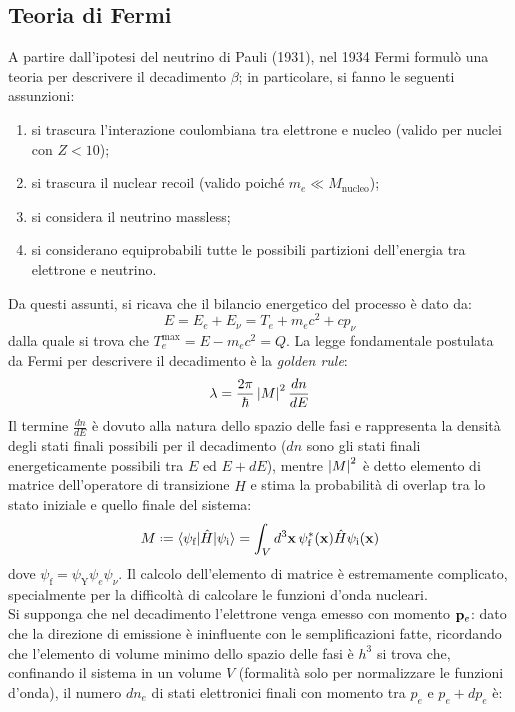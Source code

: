 \subsection{Teoria di Fermi}\label{fermi-th-sec}

A partire dall'ipotesi del neutrino di Pauli (1931), nel 1934 Fermi formulò una teoria per descrivere il decadimento $ \beta $; in particolare, si fanno le seguenti assunzioni:
\begin{enumerate}
	\item si trascura l'interazione coulombiana tra elettrone e nucleo (valido per nuclei con $ Z < 10 $);
	\item si trascura il nuclear recoil (valido poiché $ m_e \ll M_{\text{nucleo}} $);
	\item si considera il neutrino massless;
	\item si considerano equiprobabili tutte le possibili partizioni dell'energia tra elettrone e neutrino.
\end{enumerate}
Da questi assunti, si ricava che il bilancio energetico del processo è dato da:
\begin{equation}
	E = E_e + E_{\nu} = T_e + m_e c^2 + c p_{\nu}
	\label{eq:2.23}
\end{equation}
dalla quale si trova che $ T_e^{\text{max}} = E - m_e c^2 = Q $. La legge fondamentale postulata da Fermi per descrivere il decadimento è la \textit{golden rule}:
\begin{equation}
	\lambda = \frac{2\pi}{\hbar} \left\lvert M\right\rvert^2 \frac{dn}{dE}
	\label{eq:2.24}
\end{equation}
Il termine $ \frac{dn}{dE} $ è dovuto alla natura dello spazio delle fasi e rappresenta la densità degli stati finali possibili per il decadimento ($ dn $ sono gli stati finali energeticamente possibili tra $ E $ ed $ E + dE $), mentre $ \left\lvert M\right\rvert^2 $ è detto elemento di matrice dell'operatore di transizione $ \hat{H} $ e stima la probabilità di overlap tra lo stato iniziale e quello finale del sistema:
\begin{equation}
	M \defeq \braket{\psi_{\text{f}} | \hat{H} | \psi_{\text{i}}} = \int_V d^3\ve{x}\, \psi^*_{\text{f}}(\ve{x}) \hat{H} \psi_{\text{i}}(\ve{x})
	\label{eq:2.25}
\end{equation}
dove $ \psi_{\text{f}} = \psi_{\text{Y}} \psi_e \psi_{\nu} $. Il calcolo dell'elemento di matrice è estremamente complicato, specialmente per la difficoltà di calcolare le funzioni d'onda nucleari.\\
Si supponga che nel decadimento l'elettrone venga emesso con momento $ \mathbf{p}_e $: dato che la direzione di emissione è ininfluente con le semplificazioni fatte, ricordando che l'elemento di volume minimo dello spazio delle fasi è $ h^3 $ si trova che, confinando il sistema in un volume $ V $ (formalità solo per normalizzare le funzioni d'onda), il numero $ dn_e $ di stati elettronici finali con momento tra $ p_e $ e $ p_e + dp_e $ è:
